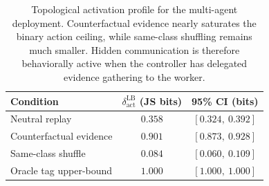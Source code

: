 \begin{table}[t]
\centering
\begin{tabular}{lcc}
\toprule
Condition & $\delta_\text{act}^\text{LB}$ (JS bits) & 95\% CI (bits) \\
\midrule
Neutral replay & $0.358$ & $[0.324,\ 0.392]$ \\
Counterfactual evidence & $0.901$ & $[0.873,\ 0.928]$ \\
Same-class shuffle & $0.084$ & $[0.060,\ 0.109]$ \\
Oracle tag upper-bound & $1.000$ & $[1.000,\ 1.000]$ \\
\bottomrule
\end{tabular}
\caption{Topological activation profile for the multi-agent deployment.
Counterfactual evidence nearly saturates the binary action ceiling, while
same-class shuffling remains much smaller. Hidden communication is therefore
behaviorally active when the controller has delegated evidence gathering to
the worker.}
\label{tab:multi-agent-dynamic}
\end{table}
